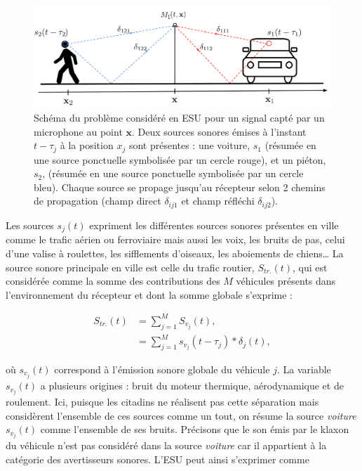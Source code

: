 \begin{figure}[hbtp]
\centering
\includegraphics[width=.9\linewidth]{./figures/autres/schema_ville_propa.pdf}
\caption{Schéma du problème considéré en ESU pour un signal capté par un microphone au point $\mathbf{x}$. Deux sources sonores émises à l'instant $t-\tau_{j}$ à la position $x_j$ sont présentes : une voiture, $s_{1}$ (résumée en une source ponctuelle symbolisée par un cercle rouge), et un piéton, $s_2$, (résumée en une source ponctuelle symbolisée par un cercle bleu). Chaque source se propage jusqu'au récepteur selon 2 chemins de propagation (champ direct $\delta_{ij1}$ et champ réfléchi $\delta_{ij2}$).}
\label{fig:schema_ville}
\end{figure}

Les sources $s_j(t)$ expriment les différentes sources sonores présentes en ville comme le trafic aérien ou ferroviaire mais aussi les voix, les bruits de pas, celui d'une valise à roulettes, les sifflements d'oiseaux, les aboiements de chiens\dots{} La source sonore principale en ville est celle du trafic routier, $S_{tr.}(t)$, qui est considérée comme la somme des contributions des $M$ véhicules présents dans l'environnement du récepteur et dont la somme globale s'exprime :

\begin{subequations}
\begin{align}
S_{tr.}(t) &= \sum_{j = 1}^M S_{v_j}(t),\\
 & = \sum_{j = 1}^M s_{v_j}(t-\tau_j) \ast \delta_{j}(t),
\end{align}
\end{subequations}

où $s_{v_j}(t)$ correspond à l'émission sonore globale du véhicule $j$. La variable $s_{v_j}(t)$ a plusieurs origines : bruit du moteur thermique, aérodynamique et de roulement. Ici, puisque les citadins ne réalisent pas cette séparation mais considèrent l'ensemble de ces sources comme un tout, on résume la source \textit{voiture} $s_{v_j}(t)$ comme l'ensemble de ses bruits. Précisons que le son émis par le klaxon du véhicule n'est pas considéré dans la source \textit{voiture} car il appartient à la catégorie des avertisseurs sonores.
L'ESU peut ainsi s'exprimer comme


